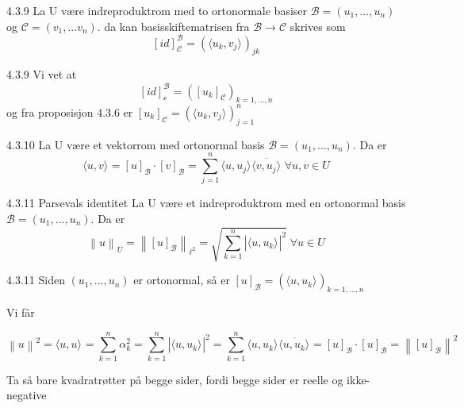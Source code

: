 \documentclass[a4paper,norsk]{article}
\begin{document}
\begin{corollarybox}{4.3.9}{}
La U være indreproduktrom med to ortonormale basiser $ \mathcal{B} = \left( u_1, ..., u_n \right)  $ og $ \mathcal{C} = \left( v_1, ... v_n \right)  $. da kan basisskiftematrisen fra $ \mathcal{B} \to \mathcal{C} $ skrives som
\[
    \left[ id \right] _{\mathcal{C}} ^{\mathcal{B}} = \left( \langle u_k, v_j \rangle_{  }  \right) _{jk}
\]
\begin{proofbox}{4.3.9}{}
Vi vet at 
\[
    \left[ id \right] _{\mathcal{c}}^{\mathcal{B}} = \left( \left[ u_k \right] _{\mathcal{C}} \right)_{k=1, ..., n}
\]
og fra proposisjon 4.3.6 er $ \left[ u_k \right] _{\mathcal{C}} = \left( \langle u_k, v_j \rangle_{  }   \right) _{j=1}^n $ 
\end{proofbox}
\end{corollarybox}

\begin{lemmabox}{4.3.10}{}
La U være et vektorrom med ortonormal basis $ \mathcal{B} = \left( u_1, ..., u_n \right)  $. Da er 
\[
    \langle u, v \rangle_{  } = \left[ u \right] _{\mathcal{B}} \cdot \left[ v \right] _{\mathcal{B}} = \sum_{ j=1 }^{ n } \langle u, u_j \rangle_{  } \overline{ \langle v, u_j \rangle_{  } } \; \forall u, v \in U
\]
\end{lemmabox}


\begin{theorembox}{4.3.11 Parsevals identitet}{}
La U være et indreproduktrom med en ortonormal basis $ \mathcal{B} = \left( u_1, ..., u_n\right)  $. Da er 
\[
    \left\lVert u \right\rVert _U = \left\lVert \left[ u \right] _{\mathcal{B}} \right\rVert_{\ell^2} = \sqrt{ \sum_{ k=1 }^{ n } \left| \langle u, u_k \rangle_{  }  \right|^2  } \; \forall u \in U
\]
\begin{proofbox}{4.3.11}{}
Siden $ \left( u_1, ..., u_n \right)  $ er ortonormal, så er $ \left[ u \right] _{\mathcal{B}} = \left( \langle u, u_k \rangle_{  }  \right)_{k=1, ..., n}   $ 

Vi får

\[
    \left\lVert u \right\rVert ^2 = \langle u, u \rangle_{  } = \sum_{ k=1 }^{ n } \alpha_{k}^{2} = \sum_{ k=1 }^{ n } \left| \langle u, u_k \rangle_{  }  \right|  ^2 = \sum_{ k=1 }^{ n } \langle u, u_k \rangle_{  } \overline{ \langle u, u_k \rangle_{  } } = \left[ u \right] _{\mathcal{B}} \cdot \left[ u \right] _{\mathcal{B}} = \left\lVert \left[ u \right] _{\mathcal{B}} \right\rVert ^2
\]

Ta så bare kvadratrøtter på begge sider, fordi begge sider er reelle og ikke-negative
\end{proofbox}
\end{theorembox}
\end{document}
